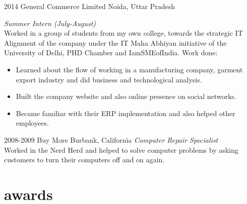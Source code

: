 \documentclass[]{devkhan-cv} %
\begin{document}
\begin{entrylist}

\entry
{2014}
{General Commerce Limited}
{Noida, Uttar Pradesh}
{\emph{Summer Intern (July-August)} \\
Worked in a group of students from my own college, towards the strategic IT Alignment of the company under the IT Maha Abhiyan initiative of the University of Delhi, PHD Chamber and IamSMEofIndia. Work done: \\
\begin{itemize}
\item Learned about the flow of working in a manufacturing company, garment export industry and did business and technological analysis.
\item Built the company website and also online presence on social networks.
\item Became familiar with their ERP implementation and also helped other employees.
\end{itemize}
}

\entry
{2008-2009}
{Buy More}
{Burbank, California}
{\emph{Computer Repair Specialist} \\
Worked in the Nerd Herd and helped to solve computer problems by asking customers to turn their computers off and on again.}


\end{entrylist}


\section{awards}

\begin{entrylist}


\end{entrylist}

\end{document}
